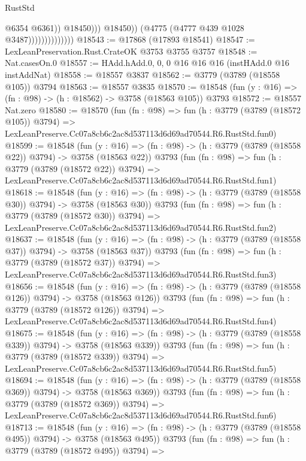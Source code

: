 \begin{lexlean}{RustStd}
\begin{coremodule}
                                          @6354
                                          @6361))
                                      @18450)))
                                @18450))
                            (@4775 (@4777 @439 @1028 @3487))))))))))))))
@18543 := @17868 (@17893 @18541)
@18547 := LexLeanPreservation.Rust.CrateOK @3753 @3755 @3757
@18548 := Nat.casesOn.{0}
@18557 := HAdd.hAdd.{0, 0, 0} @16 @16 @16 (instHAdd.{0} @16 instAddNat)
@18558 := @18557 @3837
@18562 := @3779 (@3789 (@18558 @105)) @3794
@18563 := @18557 @3835
@18570 := @18548 (fun (y : @16) => (fn : @98) -> (h : @18562) -> @3758 (@18563 @105)) @3793
@18572 := @18557 Nat.zero
@18580 := @18570
    (fun (fn : @98) =>
    fun (h : @3779 (@3789 (@18572 @105)) @3794) =>
    LexLeanPreserve.Cc07a8cb6c2ac8d537113d6d69ad70544.R6.RustStd.fun0)
@18599 := @18548
    (fun (y : @16) => (fn : @98) -> (h : @3779 (@3789 (@18558 @22)) @3794) -> @3758 (@18563 @22))
    @3793
    (fun (fn : @98) =>
    fun (h : @3779 (@3789 (@18572 @22)) @3794) =>
    LexLeanPreserve.Cc07a8cb6c2ac8d537113d6d69ad70544.R6.RustStd.fun1)
@18618 := @18548
    (fun (y : @16) => (fn : @98) -> (h : @3779 (@3789 (@18558 @30)) @3794) -> @3758 (@18563 @30))
    @3793
    (fun (fn : @98) =>
    fun (h : @3779 (@3789 (@18572 @30)) @3794) =>
    LexLeanPreserve.Cc07a8cb6c2ac8d537113d6d69ad70544.R6.RustStd.fun2)
@18637 := @18548
    (fun (y : @16) => (fn : @98) -> (h : @3779 (@3789 (@18558 @37)) @3794) -> @3758 (@18563 @37))
    @3793
    (fun (fn : @98) =>
    fun (h : @3779 (@3789 (@18572 @37)) @3794) =>
    LexLeanPreserve.Cc07a8cb6c2ac8d537113d6d69ad70544.R6.RustStd.fun3)
@18656 := @18548
    (fun (y : @16) => (fn : @98) -> (h : @3779 (@3789 (@18558 @126)) @3794) -> @3758 (@18563 @126))
    @3793
    (fun (fn : @98) =>
    fun (h : @3779 (@3789 (@18572 @126)) @3794) =>
    LexLeanPreserve.Cc07a8cb6c2ac8d537113d6d69ad70544.R6.RustStd.fun4)
@18675 := @18548
    (fun (y : @16) => (fn : @98) -> (h : @3779 (@3789 (@18558 @339)) @3794) -> @3758 (@18563 @339))
    @3793
    (fun (fn : @98) =>
    fun (h : @3779 (@3789 (@18572 @339)) @3794) =>
    LexLeanPreserve.Cc07a8cb6c2ac8d537113d6d69ad70544.R6.RustStd.fun5)
@18694 := @18548
    (fun (y : @16) => (fn : @98) -> (h : @3779 (@3789 (@18558 @369)) @3794) -> @3758 (@18563 @369))
    @3793
    (fun (fn : @98) =>
    fun (h : @3779 (@3789 (@18572 @369)) @3794) =>
    LexLeanPreserve.Cc07a8cb6c2ac8d537113d6d69ad70544.R6.RustStd.fun6)
@18713 := @18548
    (fun (y : @16) => (fn : @98) -> (h : @3779 (@3789 (@18558 @495)) @3794) -> @3758 (@18563 @495))
    @3793
    (fun (fn : @98) =>
    fun (h : @3779 (@3789 (@18572 @495)) @3794) =>

\end{coremodule}
\end{lexlean}
